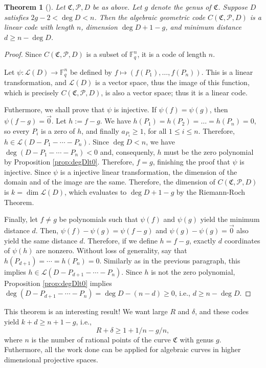\documentclass[11pt, oneside]{amsart}
\newtheorem{thm}{Theorem}[section]
\theoremstyle{definition}
\theoremstyle{remark}
\numberwithin{equation}{section}
\begin{document}
\begin{thm}[\cite{Wal00}]
	Let $\mathfrak C, \mathcal P, D$ be as above. Let $g$ denote the genus of $\mathfrak C$. Suppose $D$ satisfies $2g - 2 < \deg D < n$. Then the algebraic geometric code $C(\mathfrak C, \mathcal P, D)$ is a linear code with 
length $n$,
dimension $\deg D + 1 - g$, and 
minimum distance $d \ge n - \deg D$.
\end{thm}

\begin{proof}
	Since $C(\mathfrak C, \mathcal P, D)$ is a subset of $\mathbb{F}_q^n$, it is a code of length $n$.

	Let $\psi: \mathcal L(D) \to \mathbb{F}_q^n$ be defined by $f \mapsto (f(P_1), \dots, f(P_n))$. This is a linear transformation, and $\mathcal L(D)$ is a vector space, thus the image of this function, which is precisely $C(\mathfrak C, \mathcal P, D)$, is also a vector space; thus it is a linear code.

	Futhermore, we shall prove that $\psi$ is injective.
	If $\psi(f) = \psi(g)$, then $\psi(f - g) = \vec 0$.
	Let $h := f-g$.
	We have $h(P_1) = h(P_2) = \dots = h(P_n) = 0$, so every $P_i$ is a zero of $h$, and finally $a_{P_i} \ge 1$, for all $1 \le i \le n$.
	Therefore, $h \in \mathcal L(D - P_1 - \cdots - P_n)$.
	Since $\deg D < n$, we have $\deg(D - P_1 - \cdots - P_n) < 0$ and, consequenly, $h$ must be the zero polynomial by Proposition \ref{prop:degDlt0}.
	Therefore, $f = g$, finishing the proof that $\psi$ is injective.
	Since $\psi$ is a injective linear transformation, the dimension of the domain and of the image are the same.
	Therefore, the dimension of $C(\mathfrak C, \mathcal P, D)$ is $k = \dim \mathcal L(D)$, which evaluates to $\deg D + 1 - g$ by the Riemann-Roch Theorem.

	Finally, let $f \neq g$ be polynomials such that $\psi(f)$ and $\psi(g)$ yield the minimum distance $d$.
	Then, $\psi(f) - \psi(g) = \psi(f-g)$ and $\psi(g) - \psi(g) = \vec 0$ also yield the same distance $d$.
	Therefore, if we define $h = f - g$, exactly  $d$ coordinates of $\psi(h)$ are nonzero.
	Without loss of generality, say that $h(P_{d+1}) = \cdots = h(P_n) = 0$.
	Similarly as in the previous paragraph, this implies $h \in \mathcal L(D - P_{d+1} - \cdots - P_n)$.
	Since $h$ is not the zero polynomial, Proposition \ref{prop:degDlt0} implies $\deg(D - P_{d+1} - \cdots - P_n) = \deg D - (n-d) \ge 0$, i.e., $d \ge n - \deg D$.
\end{proof}

This theorem is an interesting result! We want large $R$ and $\delta$, and these codes yield $k + d \ge n + 1 - g$, i.e., 
	\begin{equation}
		\label{eq:g/n} R + \delta \ge 1 + 1/n - g/n,
	\end{equation}
where $n$ is the number of rational points of the curve $\mathfrak C$ with genus $g$.
Futhermore, all the work done can be applied for algebraic curves in higher dimensional projective spaces.
\end{document}
